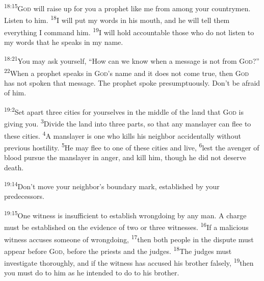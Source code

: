 \documentclass[openany,12pt,english]{book}
\newenvironment{para}{\par\pretolerance=100\tolerance=200\setlength{\emergencystretch}{0.6em}\relax}{\par}
\begin{document}
\begin{para}
    \textsuperscript{18:15}\thinspace{}\textsc{God} will raise up for you a proph\-et like me from a\-mong your countrymen. Lis\-ten to him.
    \textsuperscript{18}\thinspace{}I will put my words in his mouth, and he will tell them eve\-ry\-thing I com\-mand him.
    \textsuperscript{19}\thinspace{}I will hold ac\-count\-a\-ble those who do not lis\-ten to my words that he speaks in my name.
\end{para}

\begin{para}
    \textsuperscript{18:21}\thinspace{}You may ask your\-self, “How can we know when a mes\-sage is not from \textsc{God}?”
    \textsuperscript{22}\thinspace{}When a proph\-et speaks in \textsc{God}'s name and it does not come true, then \textsc{God} has not spo\-ken that mes\-sage. The proph\-et spoke pre\-sump\-tu\-ous\-ly. Don't be a\-fraid of him.
\end{para}

\bigskip{}

\begin{para}
    \textsuperscript{19:2}\thinspace{}Set a\-part three cit\-ies for your\-selves in the mid\-dle of the land that \textsc{God} is giv\-ing you.
    \textsuperscript{3}\thinspace{}Di\-vide the land in\-to three parts, so that any man\-slay\-er can flee to these cit\-ies.
    \textsuperscript{4}\thinspace{}A man\-slay\-er is one who kills his neigh\-bor ac\-ci\-den\-tal\-ly with\-out pre\-vi\-ous hos\-til\-i\-ty.
    \textsuperscript{5}\thinspace{}He may flee to one of these cit\-ies and live,
    \textsuperscript{6}\thinspace{}lest the a\-veng\-er of blood pur\-sue the man\-slay\-er in an\-ger, and kill him, though he did not de\-serve death.
\end{para}

\begin{para}
    \textsuperscript{19:14}\thinspace{}Don't move your neighbor's bound\-a\-ry mark, established by your predecessors.
\end{para}

\begin{para}
    \textsuperscript{19:15}\thinspace{}One wit\-ness is in\-suf\-fi\-cient to es\-tab\-lish wrong\-do\-ing by any man. A charge must be established on the ev\-i\-dence of two or three witnesses.
    \textsuperscript{16}\thinspace{}If a ma\-li\-cious wit\-ness accuses some\-one of wrong\-do\-ing,
    \textsuperscript{17}\thinspace{}then both peo\-ple in the dis\-pute must ap\-pear be\-fore \textsc{God}, be\-fore the priests and the judges.
    \textsuperscript{18}\thinspace{}The judges must in\-ves\-ti\-gate thor\-ough\-ly, and if the wit\-ness has ac\-cused his broth\-er false\-ly,
    \textsuperscript{19}\thinspace{}then you must do to him as he in\-tend\-ed to do to his broth\-er.
\end{para}
\end{document}
